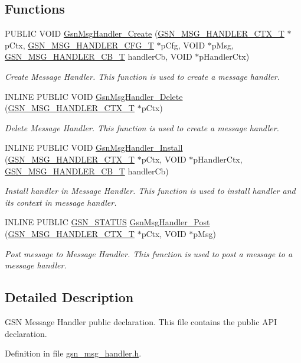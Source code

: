\subsection*{Functions}
\begin{DoxyCompactItemize}
\item 
PUBLIC VOID \hyperlink{a00627_gacc70d680d0d460b942143107dca09514}{GsnMsgHandler\_\-Create} (\hyperlink{a00155}{GSN\_\-MSG\_\-HANDLER\_\-CTX\_\-T} $\ast$pCtx, \hyperlink{a00154}{GSN\_\-MSG\_\-HANDLER\_\-CFG\_\-T} $\ast$pCfg, VOID $\ast$pMsg, \hyperlink{a00627_ga638c4ec452bde3b70fae3b7239e05cca}{GSN\_\-MSG\_\-HANDLER\_\-CB\_\-T} handlerCb, VOID $\ast$pHandlerCtx)
\begin{DoxyCompactList}\small\item\em Create Message Handler. This function is used to create a message handler. \end{DoxyCompactList}\item 
INLINE PUBLIC VOID \hyperlink{a00627_gaf9aa1fcf54621e2f9cc80cd0c8697d70}{GsnMsgHandler\_\-Delete} (\hyperlink{a00155}{GSN\_\-MSG\_\-HANDLER\_\-CTX\_\-T} $\ast$pCtx)
\begin{DoxyCompactList}\small\item\em Delete Message Handler. This function is used to create a message handler. \end{DoxyCompactList}\item 
INLINE PUBLIC VOID \hyperlink{a00627_ga1658d3ee7bb4baeaccbfb3350b834674}{GsnMsgHandler\_\-Install} (\hyperlink{a00155}{GSN\_\-MSG\_\-HANDLER\_\-CTX\_\-T} $\ast$pCtx, VOID $\ast$pHandlerCtx, \hyperlink{a00627_ga638c4ec452bde3b70fae3b7239e05cca}{GSN\_\-MSG\_\-HANDLER\_\-CB\_\-T} handlerCb)
\begin{DoxyCompactList}\small\item\em Install handler in Message Handler. This function is used to install handler and its context in message handler. \end{DoxyCompactList}\item 
INLINE PUBLIC \hyperlink{a00660_gada5951904ac6110b1fa95e51a9ddc217}{GSN\_\-STATUS} \hyperlink{a00627_gae27cb95242e79adb4d3ed617f0126c4b}{GsnMsgHandler\_\-Post} (\hyperlink{a00155}{GSN\_\-MSG\_\-HANDLER\_\-CTX\_\-T} $\ast$pCtx, VOID $\ast$pMsg)
\begin{DoxyCompactList}\small\item\em Post message to Message Handler. This function is used to post a message to a message handler. \end{DoxyCompactList}\end{DoxyCompactItemize}


\subsection{Detailed Description}
GSN Message Handler public declaration. This file contains the public API declaration. 

Definition in file \hyperlink{a00528_source}{gsn\_\-msg\_\-handler.h}.


